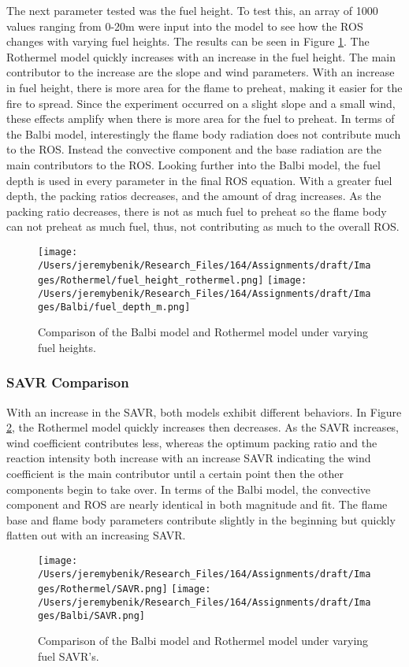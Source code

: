 \documentclass{article}
\begin{document}
\indent The next parameter tested was the fuel height. To test this, an array of 1000 values ranging from 0-20m were input into the model to see how the ROS changes with varying fuel heights. The results can be seen in Figure \ref{fuel height}. The Rothermel model quickly increases with an increase in the fuel height. The main contributor to the increase are the slope and wind parameters. With an increase in fuel height, there is more area for the flame to preheat, making it easier for the fire to spread. Since the experiment occurred on a slight slope and a small wind, these effects amplify when there is more area for the fuel to preheat. In terms of the Balbi model, interestingly the flame body radiation does not contribute much to the ROS. Instead the convective component and the base radiation are the main contributors to the ROS. Looking further into the Balbi model, the fuel depth is used in every parameter in the final ROS equation. With a greater fuel depth, the packing ratios decreases, and the amount of drag increases. As the packing ratio decreases, there is not as much fuel to preheat so the flame body can not preheat as much fuel, thus, not contributing as much to the overall ROS.
\newpage
\begin{figure}[!h]
\centering
  \texttt{[image: /Users/jeremybenik/Research\_Files/164/Assignments/draft/Images/Rothermel/fuel\_height\_rothermel.png]}
  \texttt{[image: /Users/jeremybenik/Research\_Files/164/Assignments/draft/Images/Balbi/fuel\_depth\_m.png]}
  \caption{Comparison of the Balbi model and Rothermel model under varying fuel heights.}
  \label{fuel height}
\end{figure}
\subsubsection{SAVR Comparison}
\indent With an increase in the SAVR, both models exhibit different behaviors. In Figure \ref{SAVR}, the Rothermel model quickly increases then decreases. As the SAVR increases, wind coefficient contributes less, whereas the optimum packing ratio and the reaction intensity both increase with an increase SAVR indicating the wind coefficient is the main contributor until a certain point then the other components begin to take over. In terms of the Balbi model, the convective component and ROS are nearly identical in both magnitude and fit. The flame base and flame body parameters contribute slightly in the beginning but quickly flatten out with an increasing SAVR.
\newpage
\begin{figure}[!h]
\centering
  \texttt{[image: /Users/jeremybenik/Research\_Files/164/Assignments/draft/Images/Rothermel/SAVR.png]}
  \texttt{[image: /Users/jeremybenik/Research\_Files/164/Assignments/draft/Images/Balbi/SAVR.png]}
  \caption{Comparison of the Balbi model and Rothermel model under varying fuel SAVR's.}
  \label{SAVR}
\end{figure}
\end{document}
